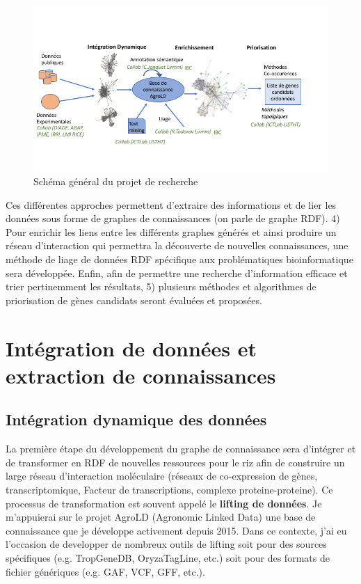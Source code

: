 \begin{figure}[!ht]
\begin{center}
	\includegraphics[width=1\textwidth]{Figures/schema-projet-recherche.png}
\end{center}
\caption{\label{schema-general} Schéma général du projet de recherche}
\end{figure}

Ces différentes approches permettent d’extraire des informations et de lier les données sous forme de graphes de connaissances (on parle de graphe RDF). 4) Pour enrichir les liens entre les différents graphes générés et ainsi produire un réseau d’interaction qui permettra la découverte de nouvelles connaissances, une méthode de liage de données RDF spécifique aux problématiques bioinformatique sera développée. Enfin, afin de permettre une recherche d’information efficace et trier pertinemment les résultats, 5) plusieurs méthodes et algorithmes de priorisation de gènes candidats seront évaluées et proposées. \\




\section{Intégration de données et extraction de connaissances}




\subsection{Intégration dynamique des données}

La première étape du développement du graphe de connaissance sera d’intégrer et de transformer en RDF de nouvelles ressources pour le riz afin de construire un large réseau d’interaction moléculaire (réseaux de co-expression de gènes, transcriptomique, Facteur de transcriptions, complexe proteine-proteine). Ce processus de transformation est souvent appelé le \textbf{lifting de données}. Je m’appuierai sur le projet AgroLD (Agronomic Linked Data) une base de connaissance que je développe activement depuis 2015. Dans ce contexte, j'ai eu l'occasion de developper de nombreux outils de lifting soit pour des sources spécifiques (e.g.  TropGeneDB, OryzaTagLine, etc.) soit pour des formats de fichier génériques (e.g. GAF, VCF, GFF, etc.). \\

